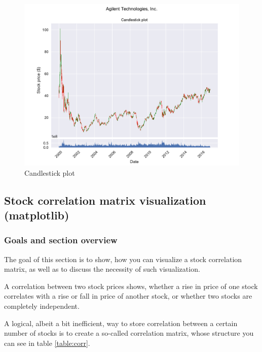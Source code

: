 \documentclass[12pt, a4paper]{article}
\begin{document}
\begin{figure}[H]
    \centering
    \includegraphics[width=\textwidth]{src/stocks/simple/candlestick}
    \caption{Candlestick plot}
    \label{fig:stock_candlestick}
\end{figure}


\newpage
\subsection{Stock correlation matrix visualization (matplotlib)} \label{ssec:stock_corr}

\subsubsection{Goals and section overview}


The goal of this section is to show, how you can visualize a stock correlation matrix, as well as to discuss the necessity of such visualization.


A correlation between two stock prices shows, whether a rise in price of one stock correlates with a rise or fall in price of another stock, or whether two stocks are completely independent.

A logical, albeit a bit inefficient, way to store correlation between a certain number of stocks is to create a so-called correlation matrix, whose structure you can see in table \ref{table:corr}.
\end{document}
